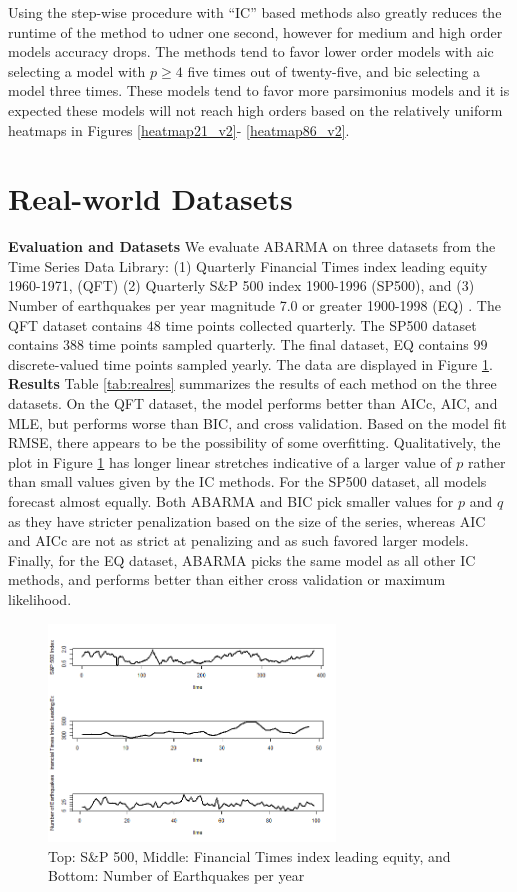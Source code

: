 Using the step-wise procedure with ``IC'' based methods also greatly reduces the runtime of the method to udner one second, however for medium and high order models accuracy drops.  The methods tend to favor lower order models with aic selecting a model with $p\geq 4$ five times out of twenty-five, and bic selecting a model three times.  These models tend to favor more parsimonius models and it is expected these models will not reach high orders based on the relatively uniform heatmaps in Figures \ref{heatmap21_v2}- \ref{heatmap86_v2}.


\section{Real-world Datasets}
\label{sec: real}

\textbf{Evaluation and Datasets} We evaluate ABARMA on three datasets from the Time Series Data Library: (1) Quarterly Financial Times index leading equity 1960-1971, (QFT) (2) Quarterly S\&P 500 index 1900-1996 (SP500), and (3) Number of earthquakes per year magnitude 7.0 or greater 1900-1998 (EQ) \cite{TSDL}. The QFT dataset contains $48$ time points collected quarterly.  The SP500 dataset contains $388$ time points sampled quarterly.  The final dataset, EQ contains $99$ discrete-valued time points sampled yearly.  The data are displayed in Figure \ref{realdata}.  \\
\textbf{Results} Table \ref{tab:realres} summarizes the results of each method on the three datasets.  On the QFT dataset, the model performs better than AICc, AIC, and MLE, but performs worse than BIC, and cross validation.  Based on the model fit RMSE, there appears to be the possibility of some overfitting.  Qualitatively, the plot in Figure \ref{realdata} has longer linear stretches indicative of a larger value of $p$ rather than small values given by the IC methods.  For the SP500 dataset, all models forecast almost equally.  Both ABARMA and BIC pick smaller values for $p$ and $q$ as they have stricter penalization based on the size of the series, whereas AIC and AICc are not as strict at penalizing and as such favored larger models.  Finally, for the EQ dataset, ABARMA picks the same model as all other IC methods, and performs better than either cross validation or maximum likelihood.  


\begin{figure}
    \centering
    \includegraphics[width=3in]{realdata}
    \caption{Top: S\&P 500, Middle: Financial Times index leading equity, and Bottom: Number of Earthquakes per year}
    \label{realdata}
\end{figure}




